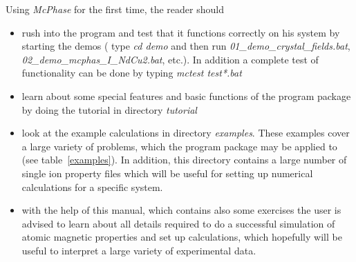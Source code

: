 \documentclass[twoside]{article}
\newcommand{\prg}{\sl}
\begin{document}
Using {\prg McPhase} for the first time, the reader should
\begin{itemize}
\item
rush into the program and test that it functions correctly on his system
by starting the demos ( type {\prg cd demo} and then run {\prg 01\_demo\_crystal\_fields.bat},{\prg %
02\_demo\_mcphas\_I\_NdCu2.bat}, etc.).  In addition a complete test of
functionality can be done by typing {\prg mctest test*.bat}
\item 
learn about some special features and basic functions of the program package by
doing the tutorial in directory {\prg tutorial}
\item
look at the example calculations in directory {\prg examples}. These examples cover a large variety
of problems, which the program package may be applied to (see table~\ref{examples}). In addition, this directory
contains a large number of single ion property files which will be useful for setting
up numerical calculations for a specific system.
\item
with the help of this manual, which contains also some exercises the user is advised 
to learn about all details required to do a successful simulation of atomic magnetic properties
and set up calculations, which hopefully will be useful to interpret a large variety of 
experimental data. 
\end{itemize}
\end{document}
